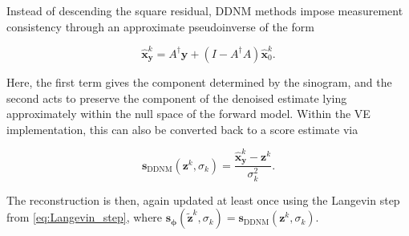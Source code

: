 Instead of descending the square residual, DDNM methods impose measurement consistency through an approximate pseudoinverse of the form

\begin{equation}
\hat{\mathbf{x}}_{\mathbf{y}}^k
=
A^\dagger\mathbf{y}
+
(I-A^\dagger A)\hat{\mathbf{x}}_0^k.
\label{eq:ddnm_measurement_consistency}
\end{equation}

Here, the first term gives the component determined by the sinogram, and the second acts to preserve the component of the denoised estimate lying approximately within the null space of the forward model. Within the VE implementation, this can also be converted back to a score estimate via

\begin{equation}
\mathbf{s}_{\mathrm{DDNM}}(\mathbf{z}^k,\sigma_k)
=
\frac{
\hat{\mathbf{x}}_{\mathbf{y}}^k-\mathbf{z}^k
}{\sigma_k^2}.
\label{eq:ddnm_score_estimate}
\end{equation}

The reconstruction is then, again updated at least once using the Langevin step from \eqref{eq:Langevin_step}, where $\mathbf{s}_{\boldsymbol{\phi}}(\tilde{\mathbf{z}}^k,\sigma_k)=\mathbf{s}_{\mathrm{DDNM}}(\mathbf{z}^k,\sigma_k)$.